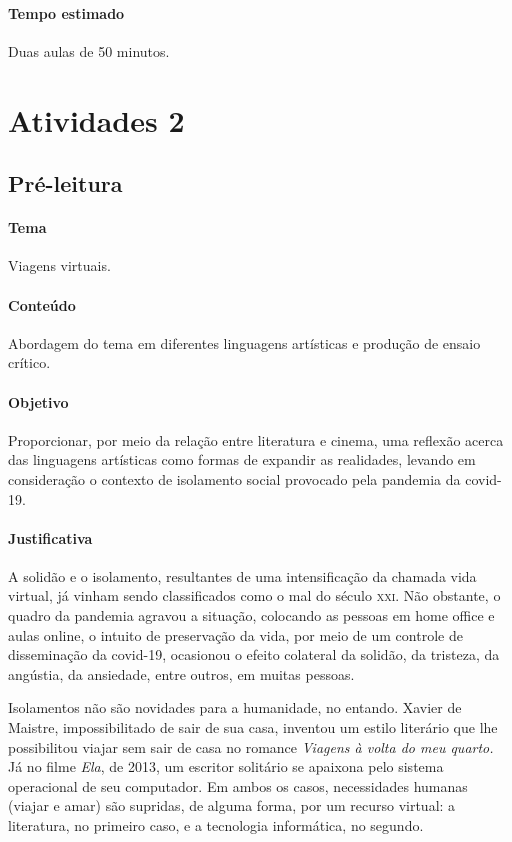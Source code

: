 \documentclass[12pt]{extarticle}
\begin{document}
\paragraph{Tempo estimado} Duas aulas de 50 minutos.

\section{Atividades 2}



\subsection{Pré-leitura}


\paragraph{Tema} Viagens virtuais.

\paragraph{Conteúdo} Abordagem do tema em diferentes linguagens artísticas
e produção de ensaio crítico. 

\paragraph{Objetivo} Proporcionar, por meio da relação entre literatura e cinema, 
uma reflexão acerca das linguagens artísticas como formas de expandir as realidades,
levando em consideração o contexto de isolamento social provocado pela pandemia da covid-19.

\paragraph{Justificativa} A solidão e o isolamento, resultantes de uma intensificação
da chamada vida virtual, já vinham sendo classificados como o mal do
século \textsc{xxi}. Não obstante, o quadro da pandemia agravou a situação,
colocando as pessoas em home office e aulas online, o intuito de
preservação da vida, por meio de um controle de disseminação da
covid-19, ocasionou o efeito colateral da solidão, da tristeza, da
angústia, da ansiedade, entre outros, em muitas pessoas.

Isolamentos não são novidades para a humanidade, no entando. Xavier de 
Maistre, impossibilitado de sair de sua casa, inventou um estilo
literário que lhe possibilitou viajar sem sair de casa no romance \emph{Viagens à volta do meu quarto.}
Já no filme \emph{Ela}, de 2013, um escritor solitário se apaixona pelo 
sistema operacional de seu computador.
Em ambos os casos, necessidades humanas (viajar e amar) são
supridas, de alguma forma, por um recurso virtual: a literatura, no primeiro caso,
e a tecnologia informática, no segundo. 
\end{document}

